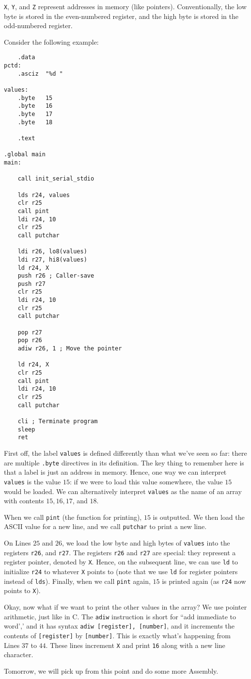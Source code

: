 \verb!X!, \verb!Y!, and \verb!Z! represent addresses in memory (like pointers). Conventionally, the low byte is stored in the even-numbered register, and the high byte is stored in the odd-numbered register. 


Consider the following example:

\begin{lstlisting}
    .data
pctd: 
    .asciz  "%d "

values:
    .byte   15
    .byte   16
    .byte   17
    .byte   18
    
    .text

.global main
main:

    call init_serial_stdio
    
    lds r24, values
    clr r25
    call pint
    ldi r24, 10
    clr r25
    call putchar
    
    ldi r26, lo8(values)
    ldi r27, hi8(values)
    ld r24, X
    push r26 ; Caller-save
    push r27
    clr r25
    ldi r24, 10
    clr r25
    call putchar
    
    pop r27
    pop r26
    adiw r26, 1 ; Move the pointer
    
    ld r24, X
    clr r25
    call pint
    ldi r24, 10
    clr r25
    call putchar
    
    cli ; Terminate program
    sleep 
    ret
\end{lstlisting}

First off, the label \verb!values! is defined differently than what we've seen so far: there are multiple \verb!.byte! directives in its definition. The key thing to remember here is that a label is just an address in memory. Hence, one way we can interpret \verb!values! is the value $15$: if we were to load this value somewhere, the value $15$ would be loaded. We can alternatively interpret \verb!values! as the name of an array with contents $15, 16, 17$, and $18$.


When we call \verb!pint! (the function for printing), $15$ is outputted. We then load the ASCII value for a new line, and we call \verb!putchar! to print a new line. 

On Lines $25$ and $26$, we load the low byte and high bytes of \verb!values! into the registers \verb!r26!, and \verb!r27!. The registers \verb!r26! and \verb!r27! are special: they represent a register pointer, denoted by \verb!X!. Hence, on the subsequent line, we can use \verb!ld! to initialize \verb!r24! to whatever \verb!X! points to (note that we use \verb!ld! for register pointers instead of \verb!lds!). Finally, when we call \verb!pint! again, $15$ is printed again (as \verb!r24! now points to \verb!X!).

Okay, now what if we want to print the other values in the array? We use pointer arithmetic, just like in C. The \verb!adiw! instruction is short for ``add immediate to word',' and it has syntax \verb!adiw [register], [number]!, and it increments the contents of \verb![register]! by \verb![number]!. This is exactly what's happening from Lines $37$ to $44$. These lines increment \verb!X! and print \verb!16! along with a new line character.


Tomorrow, we will pick up from this point and do some more Assembly.
